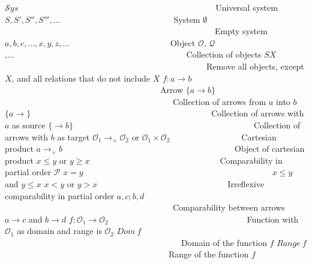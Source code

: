 \documentclass [12pt]{book}
\begin{document}
$\mathcal Sys$~~~~~~~~~~~~~~~~~~~~~~~~~~~~~~~~~~~~~~~~~~~~~~~Universal system\newline
$S,S',S'',S''',...$~~~~~~~~~~~~~~~~~~~~~~~~~~~System\newline
$\emptyset$~~~~~~~~~~~~~~~~~~~~~~~~~~~~~~~~~~~~~~~~~~~~~~~~~~Empty system\newline
$a,b,c,...,x,y,z,...$~~~~~~~~~~~~~~~~~~~~~~~~Object\newline
$\mathcal O$, $\mathcal Q$,...~~~~~~~~~~~~~~~~~~~~~~~~~~~~~~~~~~~~~~~~~Collection of objects\newline
$SX$~~~~~~~~~~~~~~~~~~~~~~~~~~~~~~~~~~~~~~~~~~~~~~~~Remove all objects, except $X$, and all relations that do not include $X$\newline
$f:a\rightarrow b$~~~~~~~~~~~~~~~~~~~~~~~~~~~~~~~~~~~~~Arrow\newline
$\{a\rightarrow b\}$~~~~~~~~~~~~~~~~~~~~~~~~~~~~~~~~~~~~~~~~Collection of arrows from $a$ into $b$\newline
$\{a\rightarrow\}$~~~~~~~~~~~~~~~~~~~~~~~~~~~~~~~~~~~~~~~~~~~Collection of arrows with $a$ as source\newline
$\{\rightarrow b\}$~~~~~~~~~~~~~~~~~~~~~~~~~~~~~~~~~~~~~~~~~~~Collection of arrows with $b$ as target\newline
$\mathcal O_1\rightarrow_\times\mathcal O_2$ or $\mathcal O_1\times\mathcal O_2$~~~~~~~~~~~~~~~~~Cartesian product\newline
$a\rightarrow_\times b$~~~~~~~~~~~~~~~~~~~~~~~~~~~~~~~~~~~~~~~~~Object of cartesian product\newline
$x\leq y$ or $y\geq x$~~~~~~~~~~~~~~~~~~~~~~~~~~~~~~~Comparability in partial order $\mathcal P$\newline
$x=y$~~~~~~~~~~~~~~~~~~~~~~~~~~~~~~~~~~~~~~~~~~~~~$x\leq y$ and $y\leq x$\newline
$x< y$ or $y>x$~~~~~~~~~~~~~~~~~~~~~~~~~~~~~~~Irreflexive comparability in partial order\newline
$a,c;b,d$~~~~~~~~~~~~~~~~~~~~~~~~~~~~~~~~~~~~~~~~Comparability between arrows $a\rightarrow c$ and $b\rightarrow d$\newline
$f:\mathcal O_1\rightarrow\mathcal O_2$~~~~~~~~~~~~~~~~~~~~~~~~~~~~~~~~~Function with $\mathcal O_1$ as domain and range is $\mathcal O_2$\newline
$Dom~f$~~~~~~~~~~~~~~~~~~~~~~~~~~~~~~~~~~~~~~~~~~Domain of the function $f$\newline
$Range~f$~~~~~~~~~~~~~~~~~~~~~~~~~~~~~~~~~~~~~~~Range of the function $f$\newline
\end{document}
